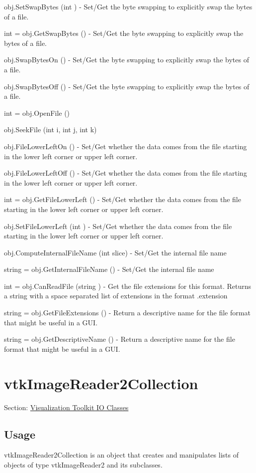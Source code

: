 \begin{DoxyItemize}
\item {\ttfamily obj.\-Set\-Swap\-Bytes (int )} -\/ Set/\-Get the byte swapping to explicitly swap the bytes of a file.  
\item {\ttfamily int = obj.\-Get\-Swap\-Bytes ()} -\/ Set/\-Get the byte swapping to explicitly swap the bytes of a file.  
\item {\ttfamily obj.\-Swap\-Bytes\-On ()} -\/ Set/\-Get the byte swapping to explicitly swap the bytes of a file.  
\item {\ttfamily obj.\-Swap\-Bytes\-Off ()} -\/ Set/\-Get the byte swapping to explicitly swap the bytes of a file.  
\item {\ttfamily int = obj.\-Open\-File ()}  
\item {\ttfamily obj.\-Seek\-File (int i, int j, int k)}  
\item {\ttfamily obj.\-File\-Lower\-Left\-On ()} -\/ Set/\-Get whether the data comes from the file starting in the lower left corner or upper left corner.  
\item {\ttfamily obj.\-File\-Lower\-Left\-Off ()} -\/ Set/\-Get whether the data comes from the file starting in the lower left corner or upper left corner.  
\item {\ttfamily int = obj.\-Get\-File\-Lower\-Left ()} -\/ Set/\-Get whether the data comes from the file starting in the lower left corner or upper left corner.  
\item {\ttfamily obj.\-Set\-File\-Lower\-Left (int )} -\/ Set/\-Get whether the data comes from the file starting in the lower left corner or upper left corner.  
\item {\ttfamily obj.\-Compute\-Internal\-File\-Name (int slice)} -\/ Set/\-Get the internal file name  
\item {\ttfamily string = obj.\-Get\-Internal\-File\-Name ()} -\/ Set/\-Get the internal file name  
\item {\ttfamily int = obj.\-Can\-Read\-File (string )} -\/ Get the file extensions for this format. Returns a string with a space separated list of extensions in the format .extension  
\item {\ttfamily string = obj.\-Get\-File\-Extensions ()} -\/ Return a descriptive name for the file format that might be useful in a G\-U\-I.  
\item {\ttfamily string = obj.\-Get\-Descriptive\-Name ()} -\/ Return a descriptive name for the file format that might be useful in a G\-U\-I.  
\end{DoxyItemize}\hypertarget{vtkio_vtkimagereader2collection}{}\section{vtk\-Image\-Reader2\-Collection}\label{vtkio_vtkimagereader2collection}
Section\-: \hyperlink{sec_vtkio}{Visualization Toolkit I\-O Classes} \hypertarget{vtkwidgets_vtkxyplotwidget_Usage}{}\subsection{Usage}\label{vtkwidgets_vtkxyplotwidget_Usage}
vtk\-Image\-Reader2\-Collection is an object that creates and manipulates lists of objects of type vtk\-Image\-Reader2 and its subclasses.

